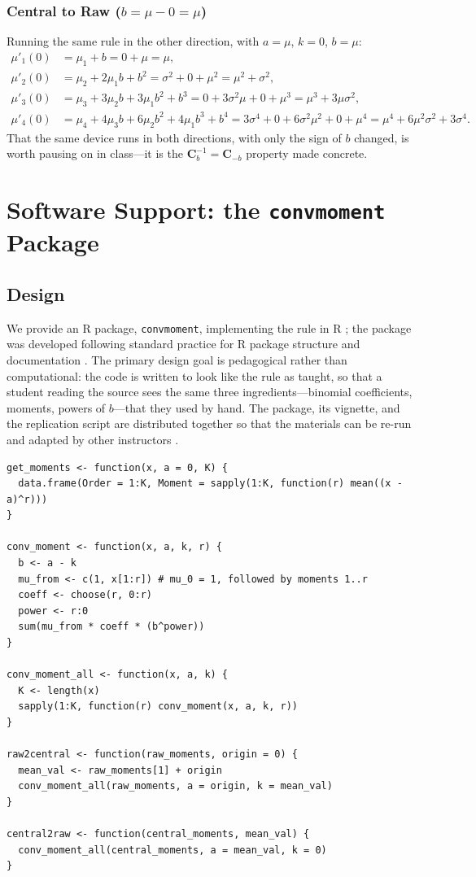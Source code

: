 \documentclass[
  12pt]{article}
\begin{document}
\subsubsection{Central to Raw ($b = \mu - 0 = \mu$)}

Running the same rule in the other direction, with $a = \mu$, $k = 0$, $b = \mu$:
\begin{align*}
\mu'_1(0) &= \mu_1 + b = 0 + \mu = \mu, \\
\mu'_2(0) &= \mu_2 + 2\mu_1 b + b^2 = \sigma^2 + 0 + \mu^2 = \mu^2 + \sigma^2, \\
\mu'_3(0) &= \mu_3 + 3\mu_2 b + 3\mu_1 b^2 + b^3 = 0 + 3\sigma^2\mu + 0 + \mu^3 = \mu^3 + 3\mu\sigma^2, \\
\mu'_4(0) &= \mu_4 + 4\mu_3 b + 6\mu_2 b^2 + 4\mu_1 b^3 + b^4 = 3\sigma^4 + 0 + 6\sigma^2\mu^2 + 0 + \mu^4 = \mu^4 + 6\mu^2\sigma^2 + 3\sigma^4.
\end{align*}
That the same device runs in both directions, with only the sign of $b$ changed, is worth pausing on in class---it is the $\mathbf{C}_b^{-1} = \mathbf{C}_{-b}$ property made concrete.

\section{Software Support: the \texttt{convmoment} Package}\label{sec-software}

\subsection{Design}

We provide an R package, \texttt{convmoment}, implementing the rule in R \citep{rcore2024}; the package was developed following standard practice for R package structure and documentation \citep{wickham2015}. The primary design goal is pedagogical rather than computational: the code is written to look like the rule as taught, so that a student reading the source sees the same three ingredients---binomial coefficients, moments, powers of $b$---that they used by hand. The package, its vignette, and the replication script are distributed together so that the materials can be re-run and adapted by other instructors \citep{dogucu2022}.

\begin{verbatim}
get_moments <- function(x, a = 0, K) {
  data.frame(Order = 1:K, Moment = sapply(1:K, function(r) mean((x - a)^r)))
}

conv_moment <- function(x, a, k, r) {
  b <- a - k
  mu_from <- c(1, x[1:r]) # mu_0 = 1, followed by moments 1..r
  coeff <- choose(r, 0:r)
  power <- r:0
  sum(mu_from * coeff * (b^power))
}

conv_moment_all <- function(x, a, k) {
  K <- length(x)
  sapply(1:K, function(r) conv_moment(x, a, k, r))
}

raw2central <- function(raw_moments, origin = 0) {
  mean_val <- raw_moments[1] + origin
  conv_moment_all(raw_moments, a = origin, k = mean_val)
}

central2raw <- function(central_moments, mean_val) {
  conv_moment_all(central_moments, a = mean_val, k = 0)
}
\end{verbatim}
\end{document}
